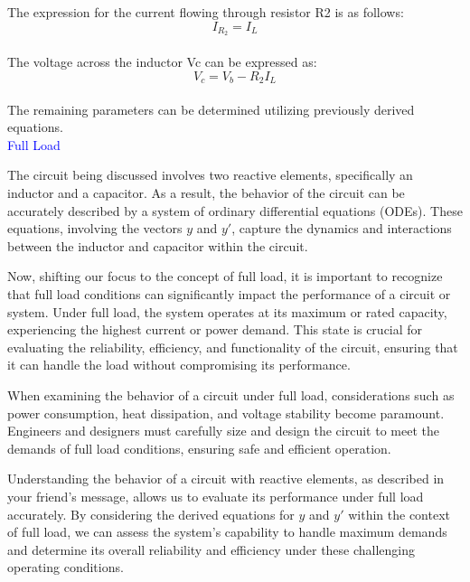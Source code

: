 The expression for the current flowing through resistor R2 is as follows:\\

\begin{equation}
    I_{R_2}=I_L
\end{equation}\\

The voltage across the inductor Vc can be expressed as:\\

\begin{equation}
    V_c=V_b-R_2I_L
\end{equation}\\

The remaining parameters can be determined utilizing previously derived equations.\\

\textcolor{blue}{Full Load}

The circuit being discussed involves two reactive elements, specifically an inductor and a capacitor. As a result, the behavior of the circuit can be accurately described by a system of ordinary differential equations (ODEs). These equations, involving the vectors $y$ and $y'$, capture the dynamics and interactions between the inductor and capacitor within the circuit.

Now, shifting our focus to the concept of full load, it is important to recognize that full load conditions can significantly impact the performance of a circuit or system. Under full load, the system operates at its maximum or rated capacity, experiencing the highest current or power demand. This state is crucial for evaluating the reliability, efficiency, and functionality of the circuit, ensuring that it can handle the load without compromising its performance.

When examining the behavior of a circuit under full load, considerations such as power consumption, heat dissipation, and voltage stability become paramount. Engineers and designers must carefully size and design the circuit to meet the demands of full load conditions, ensuring safe and efficient operation.

Understanding the behavior of a circuit with reactive elements, as described in your friend's message, allows us to evaluate its performance under full load accurately. By considering the derived equations for $y$ and $y'$ within the context of full load, we can assess the system's capability to handle maximum demands and determine its overall reliability and efficiency under these challenging operating conditions.

